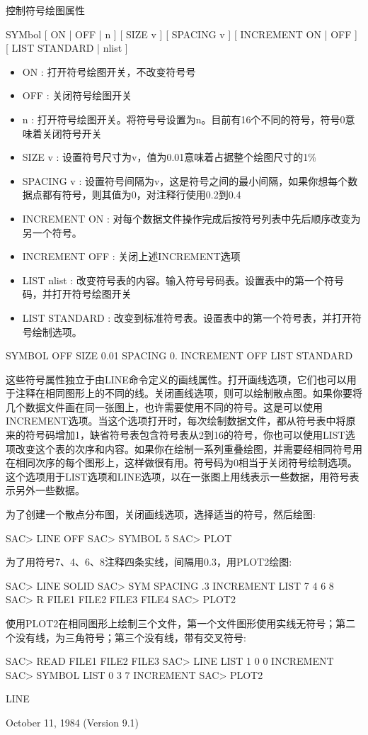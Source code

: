 \label{cmd:symbol}

控制符号绘图属性

SYMbol [ ON | OFF | n ] [ SIZE v ] [ SPACING v ] [ INCREMENT ON | OFF ] [ LIST STANDARD | nlist ]

\begin{itemize}
\item ON : 打开符号绘图开关，不改变符号号 
\item OFF : 关闭符号绘图开关 
\item n : 打开符号绘图开关。将符号号设置为n。目前有16个不同的符号，符号0意味着关闭符号开关  
\item SIZE v : 设置符号尺寸为v，值为0.01意味着占据整个绘图尺寸的1\%	
\item SPACING v : 设置符号间隔为v，这是符号之间的最小间隔，如果你想每个数据点都有符号，则其值为0，对注释行使用0.2到0.4
\item INCREMENT {ON} : 对每个数据文件操作完成后按符号列表中先后顺序改变为另一个符号。 
\item INCREMENT OFF : 关闭上述INCREMENT选项 
\item LIST nlist : 改变符号表的内容。输入符号号码表。设置表中的第一个符号码，并打开符号绘图开关 
\item LIST STANDARD : 改变到标准符号表。设置表中的第一个符号表，并打开符号绘制选项。 
\end{itemize}

SYMBOL OFF SIZE 0.01 SPACING 0. INCREMENT OFF LIST STANDARD

这些符号属性独立于由LINE命令定义的画线属性。打开画线选项，它们也可以用于注释在相同图形上的不同的线。关闭画线选项，则可以绘制散点图。如果你要将几个数据文件画在同一张图上，也许需要使用不同的符号。这是可以使用INCREMENT选项。当这个选项打开时，每次绘制数据文件，都从符号表中将原来的符号码增加1，缺省符号表包含符号表从2到16的符号，你也可以使用LIST选项改变这个表的次序和内容。如果你在绘制一系列重叠绘图，并需要经相同符号用在相同次序的每个图形上，这样做很有用。符号码为0相当于关闭符号绘制选项。这个选项用于LIST选项和LINE选项，以在一张图上用线表示一些数据，用符号表示另外一些数据。

为了创建一个散点分布图，关闭画线选项，选择适当的符号，然后绘图:
\begin{SACCode}
SAC> LINE OFF
SAC> SYMBOL 5
SAC> PLOT
\end{SACCode}

为了用符号7、4、6、8注释四条实线，间隔用0.3，用PLOT2绘图:
\begin{SACCode}
SAC> LINE SOLID
SAC> SYM SPACING .3 INCREMENT LIST 7 4 6 8
SAC> R FILE1 FILE2 FILE3 FILE4
SAC> PLOT2
\end{SACCode}

使用PLOT2在相同图形上绘制三个文件，第一个文件图形使用实线无符号；第二个没有线，为三角符号；第三个没有线，带有交叉符号:
\begin{SACCode}
SAC> READ FILE1 FILE2 FILE3
SAC> LINE LIST 1 0 0 INCREMENT
SAC> SYMBOL LIST 0 3 7 INCREMENT
SAC> PLOT2
\end{SACCode}

LINE

October 11, 1984 (Version 9.1)
